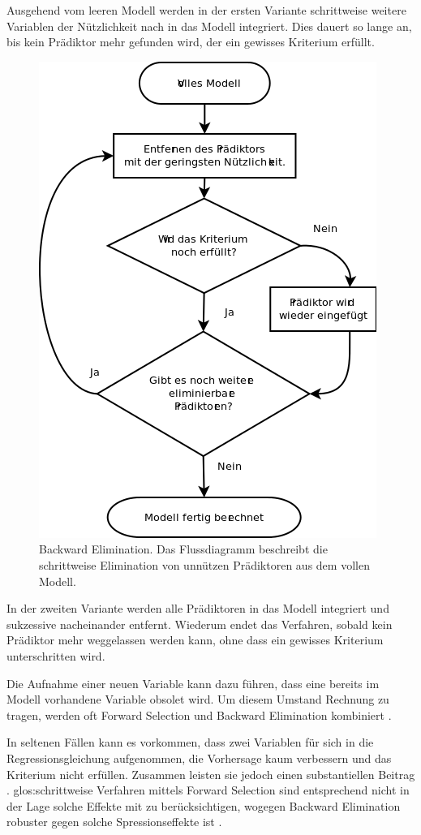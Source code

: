 Ausgehend vom leeren Modell werden in der ersten Variante schrittweise weitere Variablen der Nützlichkeit nach in das Modell integriert. Dies dauert so lange an, bis kein Prädiktor mehr gefunden wird, der ein gewisses Kriterium erfüllt.
\begin{figure}[H]
	\centering
	\includegraphics[height=0.5\textheight]{backward_stepwise.png}
	\caption{Backward Elimination. Das Flussdiagramm beschreibt die schrittweise Elimination von unnützen Prädiktoren aus dem vollen Modell.}
	\label{fig:backward_stepwise}
\end{figure}
In der zweiten Variante werden alle Prädiktoren in das Modell integriert und sukzessive nacheinander entfernt. Wiederum endet das Verfahren, sobald kein Prädiktor mehr weggelassen werden kann, ohne dass ein gewisses Kriterium unterschritten wird.

Die Aufnahme einer neuen Variable kann dazu führen, dass eine bereits im Modell vorhandene Variable obsolet wird. 
Um diesem Umstand Rechnung zu tragen, werden oft Forward Selection und Backward Elimination kombiniert \cite[p. 461]{bortz2011}. 

In seltenen Fällen kann es vorkommen, dass zwei Variablen für sich in die Regressionsgleichung aufgenommen, die Vorhersage kaum verbessern und das Kriterium nicht erfüllen. Zusammen leisten sie jedoch  einen substantiellen Beitrag \cite[p.261]{jacob2003applied}. 
\Gls{glos:schrittweise Verfahren} mittels Forward Selection sind entsprechend nicht in der Lage solche Effekte mit zu berücksichtigen, wogegen Backward Elimination robuster gegen solche Spressionseffekte ist \cite{shieh2006suppression}. 

